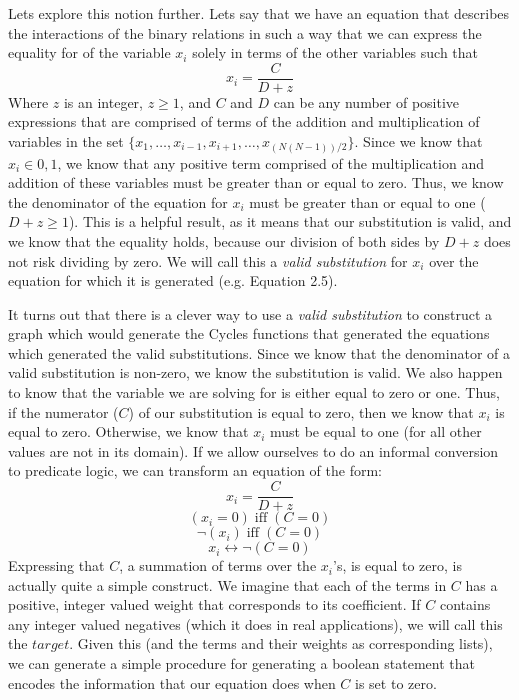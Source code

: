 Lets explore this notion further.  
Lets say that we have an equation that describes the interactions of the binary relations in such a way that we can express the equality for of the variable 
$x_i$ solely in terms of the other variables such that $$x_i = \frac{C}{D + z}$$ Where $z$ is an integer, $z \geq 1$, and $C$ and $D$ 
can be any number of positive expressions that are comprised of terms of the addition and multiplication of variables in the set 
$\{x_1, \dots,  x_{i-1},x_{i+1}, \dots, x_{(N(N-1))/2}\}$.  Since we know that $x_i \in {0,1}$, we know that any positive term comprised of the multiplication and addition of these variables must be greater than or equal to zero.  
Thus, we know the denominator of the equation for $x_i$ must be greater than or equal to one ($D + z \geq 1$). 
This is a helpful result, as it means that our substitution is valid, and we know that the equality holds, because our division of both sides by $D + z$ 
does not risk dividing by zero.  We will call this a \emph{valid substitution} for $x_i$ over the equation for which it is generated (e.g. Equation 2.5). 

It turns out that there is a clever way to use a \emph{valid substitution} to construct a graph which would generate the Cycles functions that generated the equations which generated the valid substitutions.
Since we know that the denominator of a valid substitution is non-zero, we know the substitution is valid.  
We also happen to know that the variable we are solving for is either equal to zero or one.  
Thus, if the numerator ($C$) of our substitution is equal to zero, then we know that $x_i$ is equal to zero.  
Otherwise, we know that $x_i$ must be equal to one (for all other values are not in its domain). 
If we allow ourselves to do an informal conversion to predicate logic, we can transform an equation of the form:
 $$x_i = \frac{C}{D + z}$$ 
 $$(x_i = 0) \; \text{iff} \; (C = 0)$$
 $$\neg(x_i) \; \text{iff} \; (C = 0)$$
 $$x_i  \leftrightarrow  \neg(C = 0)$$
Expressing that $C$, a summation of terms over the $x_i$'s, is equal to zero, is actually quite a simple construct. 
We imagine that each of the terms in $C$ has a positive, integer valued weight that corresponds to its coefficient. 
If $C$ contains any integer valued negatives (which it does in real applications), we will call this the $target$.
Given this (and the terms and their weights as corresponding lists), we can generate a simple procedure for generating a boolean statement that encodes the information that our equation does when $C$ is set to zero.

